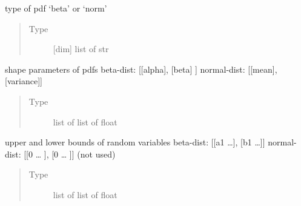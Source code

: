\documentclass[letterpaper,10pt,english,openany,oneside]{sphinxmanual}
\begin{document}
\begin{fulllineitems}

\begin{fulllineitems}
\label{\detokenize{pygpc:pygpc.quad.Quad.pdf_type}}
type of pdf ‘beta’ or ‘norm’
\begin{quote}\begin{description}
\item[{Type}] \leavevmode
{[}dim{]} list of str

\end{description}\end{quote}

\end{fulllineitems}


\begin{fulllineitems}
\label{\detokenize{pygpc:pygpc.quad.Quad.pdf_shape}}
shape parameters of pdfs
beta-dist:   {[}{[}alpha{]}, {[}beta{]}    {]}
normal-dist: {[}{[}mean{]},  {[}variance{]}{]}
\begin{quote}\begin{description}
\item[{Type}] \leavevmode
list of list of float

\end{description}\end{quote}

\end{fulllineitems}


\begin{fulllineitems}
\label{\detokenize{pygpc:pygpc.quad.Quad.limits}}
upper and lower bounds of random variables
beta-dist:   {[}{[}a1 …{]}, {[}b1 …{]}{]}
normal-dist: {[}{[}0 … {]}, {[}0 … {]}{]} (not used)
\begin{quote}\begin{description}
\item[{Type}] \leavevmode
list of list of float

\end{description}\end{quote}

\end{fulllineitems}



\end{fulllineitems}
\end{document}
